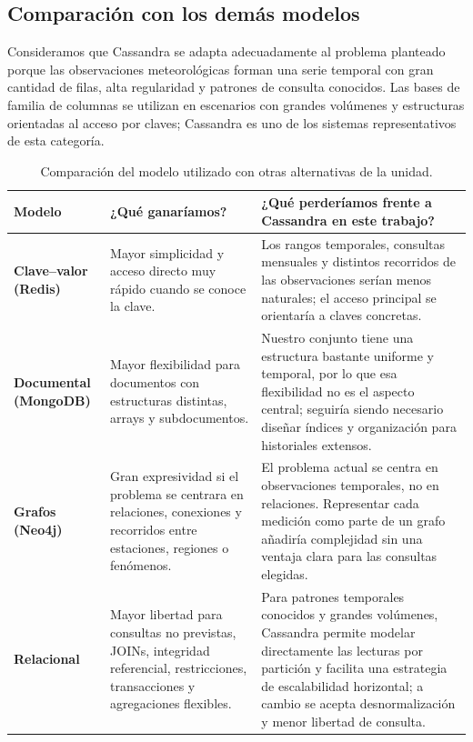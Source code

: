 \subsection{Comparación con los demás modelos}

Consideramos que Cassandra se adapta adecuadamente al problema planteado porque las observaciones meteorológicas forman una serie temporal con gran cantidad de filas, alta regularidad y patrones de consulta conocidos. Las bases de familia de columnas se utilizan en escenarios con grandes volúmenes y estructuras orientadas al acceso por claves; Cassandra es uno de los sistemas representativos de esta categoría. \parencite[cap.~10, pp.~98--109]{sadalage2012} \parencite[cap.~24, pp.~914--938]{elmasri2016}

\begin{table}[H]
\centering
\caption{Comparación del modelo utilizado con otras alternativas de la unidad.}
\label{tab:comparacion-modelos}
\begin{tabularx}{\linewidth}{>{\bfseries}p{2.6cm}XX}
\toprule
Modelo & ¿Qué ganaríamos? & ¿Qué perderíamos frente a Cassandra en este trabajo? \\
\midrule
Clave--valor (Redis) & Mayor simplicidad y acceso directo muy rápido cuando se conoce la clave. & Los rangos temporales, consultas mensuales y distintos recorridos de las observaciones serían menos naturales; el acceso principal se orientaría a claves concretas. \\
\addlinespace
Documental (MongoDB) & Mayor flexibilidad para documentos con estructuras distintas, arrays y subdocumentos. & Nuestro conjunto tiene una estructura bastante uniforme y temporal, por lo que esa flexibilidad no es el aspecto central; seguiría siendo necesario diseñar índices y organización para historiales extensos. \\
\addlinespace
Grafos (Neo4j) & Gran expresividad si el problema se centrara en relaciones, conexiones y recorridos entre estaciones, regiones o fenómenos. & El problema actual se centra en observaciones temporales, no en relaciones. Representar cada medición como parte de un grafo añadiría complejidad sin una ventaja clara para las consultas elegidas. \\
\addlinespace
Relacional & Mayor libertad para consultas no previstas, JOINs, integridad referencial, restricciones, transacciones y agregaciones flexibles. & Para patrones temporales conocidos y grandes volúmenes, Cassandra permite modelar directamente las lecturas por partición y facilita una estrategia de escalabilidad horizontal; a cambio se acepta desnormalización y menor libertad de consulta. \\
\bottomrule
\end{tabularx}
\end{table}

